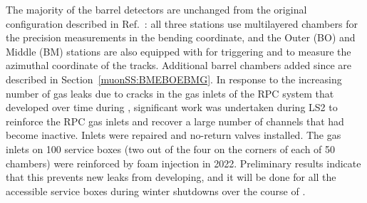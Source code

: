 \documentclass[cernpreprint, atlasdraft=false, UKenglish,british,orcidlogo, texmf, orcidlogo]{atlasdoc}
\begin{document}
The majority of the barrel detectors are unchanged from the original \RunOne configuration described in Ref.~\cite{ATLAS-TDR-20}: all three stations use multilayered
chambers for the precision measurements in the bending coordinate, and the Outer (BO) and Middle (BM) stations are also equipped with
for triggering and to measure the azimuthal coordinate of the tracks.
Additional barrel chambers added since \RunOne are described in Section~\ref{muonSS:BMEBOEBMG}.
In response to the increasing number of gas leaks due to cracks in the gas inlets of the \gls{RPC} system that developed over time during \RunTwo,
significant work was undertaken during \gls{LS2} to reinforce the \gls{RPC} gas inlets and recover a large number of channels that had become inactive. Inlets were repaired and no-return valves installed. The gas inlets on \num{100} service boxes (two out of the four on the corners of each of \num{50} chambers) were reinforced by foam injection in 2022. Preliminary results indicate that this prevents new leaks from developing, and it will be done for all the accessible service boxes during winter shutdowns over the course of \RunThr. 
 
\end{document}
